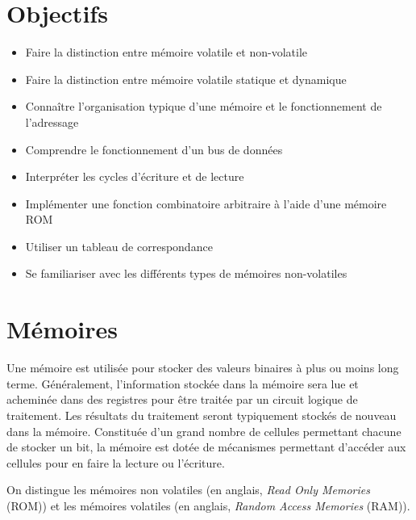 \documentclass[letter, oneside]{book}
\begin{document}
\section{Objectifs}
\label{sec:org4a4f4d1}
\begin{itemize}
\item Faire la distinction entre mémoire volatile et non-volatile
\item Faire la distinction entre mémoire volatile statique et dynamique
\item Connaître l'organisation typique d'une mémoire et le fonctionnement
de l'adressage
\item Comprendre le fonctionnement d'un bus de données
\item Interpréter les cycles d'écriture et de lecture
\item Implémenter une fonction combinatoire arbitraire à l'aide d'une
mémoire ROM
\item Utiliser un tableau de correspondance
\item Se familiariser avec les différents types de mémoires non-volatiles
\end{itemize}

\section{Mémoires}
\label{sec:org461aac5}

Une mémoire est utilisée pour stocker des valeurs binaires à plus ou
moins long terme. Généralement, l'information stockée dans la mémoire
sera lue et acheminée dans des registres pour être traitée par un
circuit logique de traitement. Les résultats du traitement seront
typiquement stockés de nouveau dans la mémoire. Constituée d'un grand
nombre de cellules permettant chacune de stocker un bit, la mémoire
est dotée de mécanismes permettant d'accéder aux cellules pour en
faire la lecture ou l'écriture.

On distingue les mémoires non volatiles (en anglais, \emph{Read Only
Memories} (ROM)) et les mémoires volatiles (en anglais, \emph{Random Access
Memories} (RAM)).
\end{document}
